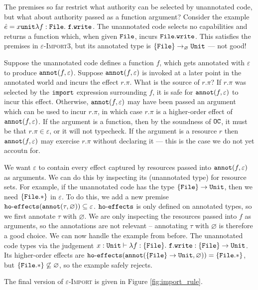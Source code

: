 The premises so far restrict what authority can be selected by unannotated code, but what about authority passed as a function argument? Consider the example $\hat e = {x}{\mathtt{unit}}{\lambda f: { \mathtt{File} }.~\mathtt{f.write}}$. The unannotated code selects no capabilities and returns a function which, when given $\mathtt{File}$, incurs $\mathtt{File.write}$. This satisfies the premises in \textsc{$\varepsilon$-Import3}, but its annotated type is $\{ \mathtt{File} \} \rightarrow_{\varnothing} \mathtt{Unit}$ --- not good!

Suppose the unannotated code defines a function $f$, which gets annotated with $\varepsilon$ to produce $\mathtt{annot}(f, \varepsilon)$. Suppose $\mathtt{annot}(f, \varepsilon)$ is invoked at a later point in the annotated world and incurs the effect $r.\pi$. What is the source of $r.\pi$? If $r.\pi$ was selected by the $\mathtt{import}$ expression surrounding $f$, it is safe for $\mathtt{annot}(f, \varepsilon)$ to incur this effect. Otherwise, $\mathtt{annot}(f, \varepsilon)$ may have been passed an argument which can be used to incur $r.\pi$, in which case $r.\pi$ is a higher-order effect of $\mathtt{annot}(f, \varepsilon)$. If the argument is a function, then by the soundness of $\mathtt{OC}$, it must be that $r.\pi \in \varepsilon$, or it will not typecheck. If the argument is a resource $r$ then $\mathtt{annot}(f, \varepsilon)$ may exercise $r.\pi$ without declaring it --- this is the case we do not yet accoutn for.

We want $\varepsilon$ to contain every effect captured by resources passed into $\mathtt{annot}(f, \varepsilon)$ as arguments. We can do this by inspecting its (unannotated type) for resource sets. For example, if the unannotated code has the type $\mathtt{ \{ File \} \rightarrow \mathtt{Unit}}$, then we need $\mathtt{ \{ File.* \} }$ in $\varepsilon$. To do this, we add a new premise $\mathtt{ho \hbox{-} effects}(\mathtt{annot}(\tau, \varnothing)) \subseteq \varepsilon$. $\mathtt{ho \hbox{-} effects}$ is only defined on annotated types, so we first annotate $\tau$ with $\varnothing$. We are only inspecting the resources passed into $f$ as arguments, so the annotations are not relevant -- annotating $\tau$ with $\varnothing$ is therefore a good choice. We can now handle the example from before. The unannotated code types via the judgement $x: \mathtt{Unit} \vdash \lambda f: \{ \mathtt{File} \}.~\mathtt{f.write}: \{ \mathtt{File} \} \rightarrow \mathtt{Unit}$. Its higher-order effects are $\mathtt{ho \hbox{-} effects}(\mathtt{annot}( \{ \mathtt{File} \} \rightarrow \mathtt{Unit}, \varnothing)) = \{ \mathtt{File.*} \}$, but $\{ \mathtt{File.*} \} \not\subseteq \varnothing$, so the example safely rejects.

The final version of \textsc{$\varepsilon$-Import} is given in Figure \ref{fig:import_rule}.

